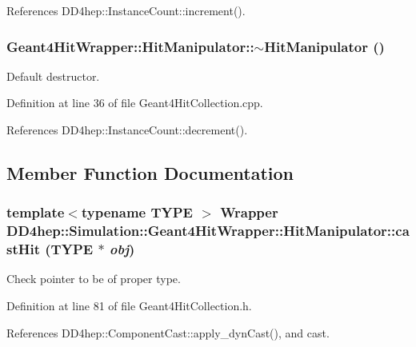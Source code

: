 References DD4hep::InstanceCount::increment().\hypertarget{class_d_d4hep_1_1_simulation_1_1_geant4_hit_wrapper_1_1_hit_manipulator_a61e4ad1fbefa9c366136011854d033e0}{
\subsubsection[{$\sim$HitManipulator}]{\setlength{\rightskip}{0pt plus 5cm}Geant4HitWrapper::HitManipulator::$\sim$HitManipulator ()}}
\label{class_d_d4hep_1_1_simulation_1_1_geant4_hit_wrapper_1_1_hit_manipulator_a61e4ad1fbefa9c366136011854d033e0}


Default destructor. 

Definition at line 36 of file Geant4HitCollection.cpp.

References DD4hep::InstanceCount::decrement().

\subsection{Member Function Documentation}
\hypertarget{class_d_d4hep_1_1_simulation_1_1_geant4_hit_wrapper_1_1_hit_manipulator_a8ea3f2054e5c167ad0cc904b070c9a1c}{
\subsubsection[{castHit}]{\setlength{\rightskip}{0pt plus 5cm}template$<$typename TYPE $>$ {\bf Wrapper} DD4hep::Simulation::Geant4HitWrapper::HitManipulator::castHit (TYPE $\ast$ {\em obj})}}
\label{class_d_d4hep_1_1_simulation_1_1_geant4_hit_wrapper_1_1_hit_manipulator_a8ea3f2054e5c167ad0cc904b070c9a1c}


Check pointer to be of proper type. 

Definition at line 81 of file Geant4HitCollection.h.

References DD4hep::ComponentCast::apply\_\-dynCast(), and cast.

